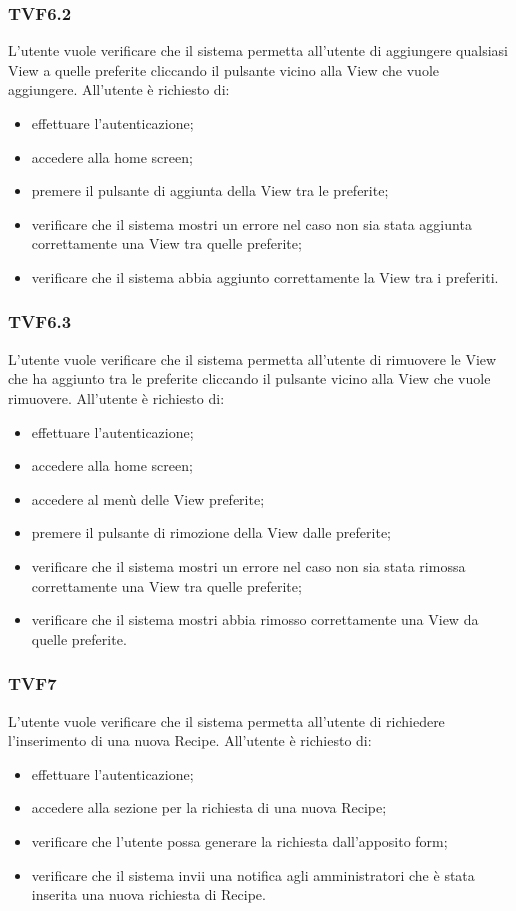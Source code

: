 		\subsubsection{TVF6.2}
			L'utente vuole verificare che il sistema permetta all'utente di aggiungere qualsiasi View a quelle preferite cliccando il pulsante vicino alla View che vuole aggiungere. All'utente è richiesto di:
			\begin{itemize}
				\item effettuare l'autenticazione;
				\item accedere alla home screen;
				\item premere il pulsante di aggiunta della View tra le preferite;
				\item verificare che il sistema mostri un errore nel caso non sia stata aggiunta correttamente una View tra quelle preferite;
				\item verificare che il sistema abbia aggiunto correttamente la View tra i preferiti.
			\end{itemize}
			
		\subsubsection{TVF6.3}
			L'utente vuole verificare che il sistema permetta all'utente di rimuovere le View che  ha aggiunto tra le preferite cliccando il pulsante vicino alla View che vuole rimuovere. All'utente è richiesto di:
			\begin{itemize}
				\item effettuare l'autenticazione;
				\item accedere alla home screen;
				\item accedere al menù delle View preferite;
				\item premere il pulsante di rimozione della View dalle preferite;
				\item verificare che il sistema mostri un errore nel caso non sia stata rimossa correttamente una View tra quelle preferite;
				\item verificare che il sistema mostri abbia rimosso correttamente una View da quelle preferite.
			\end{itemize}
			
		\subsubsection{TVF7}
			L'utente vuole verificare che il sistema permetta all'utente di richiedere l'inserimento di una nuova Recipe. All'utente è richiesto di:
			\begin{itemize}
				\item effettuare l'autenticazione;
				\item accedere alla sezione per la richiesta di una nuova Recipe;
				\item verificare che l'utente possa generare la richiesta dall'apposito form;
				\item verificare che il sistema invii una notifica agli amministratori che è stata inserita  una nuova richiesta di Recipe.
			\end{itemize}
			
